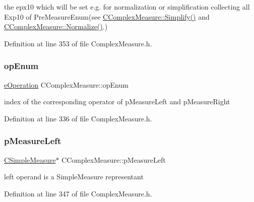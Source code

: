 the epx10 which will be set e.\+g. for normalization or simplification collecting all Exp10 of Pre\+Measure\+Enum(see \hyperlink{classCComplexMeasure_addb4e69033f2c32fb3bf4a3aef5e1470}{C\+Complex\+Measure\+::\+Simplify()} and \hyperlink{classCComplexMeasure_a87cc1f3c3f0dafd7cbe00634124c8d46}{C\+Complex\+Measure\+::\+Normalize()}.) 



Definition at line 353 of file Complex\+Measure.\+h.

\mbox{\label{classCComplexMeasure_ae22369976a7e5570add11a4172dcf062}} 
\subsubsection{\texorpdfstring{op\+Enum}{opEnum}}
{\footnotesize\ttfamily \hyperlink{MeasureOperator_8h_a1431c79e3ad4b4c5bcc9f31f188538f2}{e\+Operation} C\+Complex\+Measure\+::op\+Enum\hspace{0.3cm}{\ttfamily [protected]}}



index of the corresponding operator of p\+Measure\+Left and p\+Measure\+Right 



Definition at line 336 of file Complex\+Measure.\+h.

\mbox{\label{classCComplexMeasure_a4d68f86891a036df81f5b1a344c36f27}} 
\subsubsection{\texorpdfstring{p\+Measure\+Left}{pMeasureLeft}}
{\footnotesize\ttfamily \hyperlink{classCSimpleMeasure}{C\+Simple\+Measure}$\ast$ C\+Complex\+Measure\+::p\+Measure\+Left\hspace{0.3cm}{\ttfamily [protected]}}



left operand is a Simple\+Measure representant 



Definition at line 347 of file Complex\+Measure.\+h.

\mbox{\label{classCComplexMeasure_abbafc4b16676d223ed34860b8ece1b6b}} 
